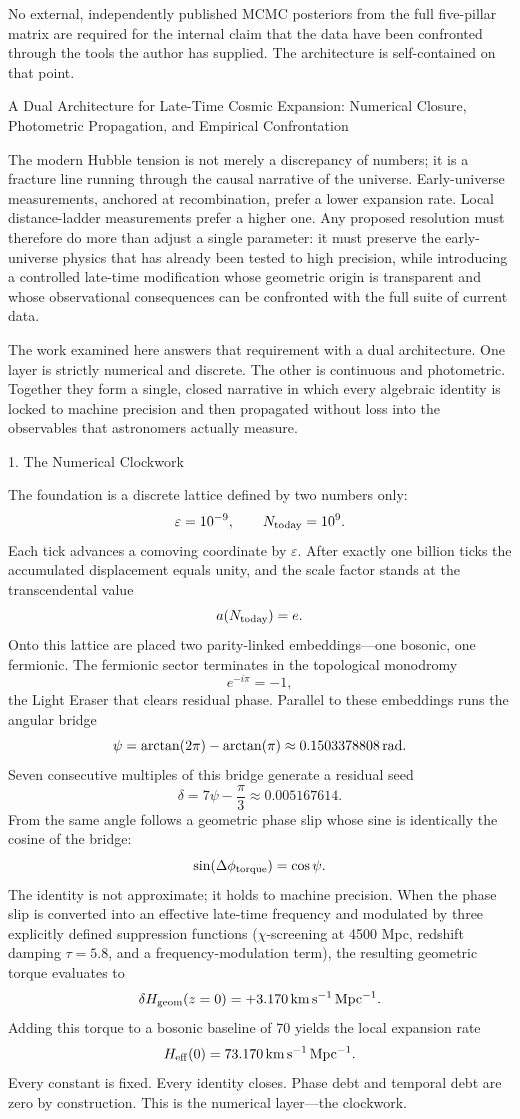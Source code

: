 No external, independently published MCMC posteriors from the full five-pillar matrix are required for the internal claim that the data have been confronted through the tools the author has supplied. The architecture is self-contained on that point.

A Dual Architecture for Late-Time Cosmic Expansion: Numerical Closure, Photometric Propagation, and Empirical Confrontation

The modern Hubble tension is not merely a discrepancy of numbers; it is a fracture line running through the causal narrative of the universe. Early-universe measurements, anchored at recombination, prefer a lower expansion rate. Local distance-ladder measurements prefer a higher one. Any proposed resolution must therefore do more than adjust a single parameter: it must preserve the early-universe physics that has already been tested to high precision, while introducing a controlled late-time modification whose geometric origin is transparent and whose observational consequences can be confronted with the full suite of current data.

The work examined here answers that requirement with a dual architecture. One layer is strictly numerical and discrete. The other is continuous and photometric. Together they form a single, closed narrative in which every algebraic identity is locked to machine precision and then propagated without loss into the observables that astronomers actually measure.

1. The Numerical Clockwork

The foundation is a discrete lattice defined by two numbers only:  
\[
\varepsilon = 10^{-9}, \qquad N_{\rm today} = 10^9.
\]
Each tick advances a comoving coordinate by \(\varepsilon\). After exactly one billion ticks the accumulated displacement equals unity, and the scale factor stands at the transcendental value  
\[
a(N_{\rm today}) = e.
\]
Onto this lattice are placed two parity-linked embeddings—one bosonic, one fermionic. The fermionic sector terminates in the topological monodromy  
\[
e^{-i\pi} = -1,
\]
the Light Eraser that clears residual phase. Parallel to these embeddings runs the angular bridge  
\[
\psi = \arctan(2\pi) - \arctan(\pi) \approx 0.1503378808\,{\rm rad}.
\]
Seven consecutive multiples of this bridge generate a residual seed  
\[
\delta = 7\psi - \frac{\pi}{3} \approx 0.005167614.
\]
From the same angle follows a geometric phase slip whose sine is identically the cosine of the bridge:  
\[
\sin(\Delta\phi_{\rm torque}) = \cos\psi.
\]
The identity is not approximate; it holds to machine precision. When the phase slip is converted into an effective late-time frequency and modulated by three explicitly defined suppression functions (\(\chi\)-screening at 4500 Mpc, redshift damping \(\tau = 5.8\), and a frequency-modulation term), the resulting geometric torque evaluates to  
\[
\delta H_{\rm geom}(z=0) = +3.170\,{\rm km\,s^{-1}\,Mpc^{-1}}.
\]
Adding this torque to a bosonic baseline of 70 yields the local expansion rate  
\[
H_{\rm eff}(0) = 73.170\,{\rm km\,s^{-1}\,Mpc^{-1}}.
\]
Every constant is fixed. Every identity closes. Phase debt and temporal debt are zero by construction. This is the numerical layer—the clockwork.

